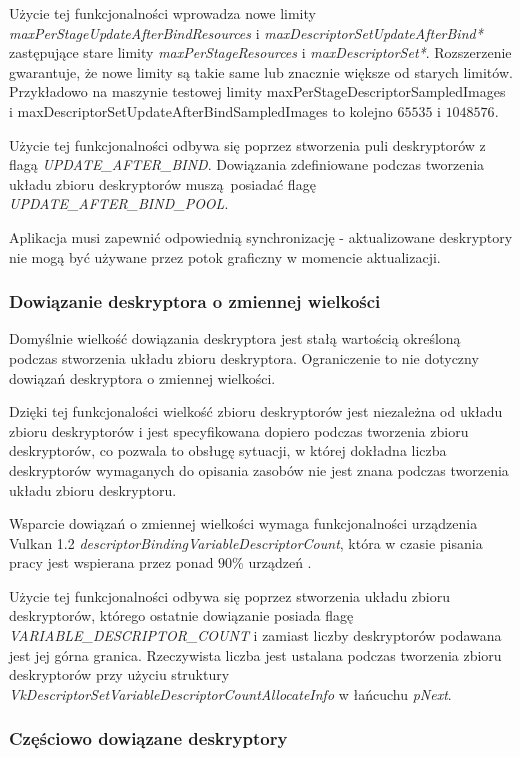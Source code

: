 Użycie tej funkcjonalności wprowadza nowe limity \textit{maxPerStageUpdateAfterBindResources} i \textit{maxDescriptorSetUpdateAfterBind*}
zastępujące stare limity \textit{maxPerStageResources} i \textit{maxDescriptorSet*}. Rozszerzenie gwarantuje, że nowe limity są takie same lub znacznie większe od starych limitów. Przykładowo na maszynie testowej limity maxPerStageDescriptorSampledImages i maxDescriptorSetUpdateAfterBindSampledImages to kolejno $65535$ i $1048576$.

Użycie tej funkcjonalności odbywa się poprzez stworzenia puli deskryptorów z flagą \textit{UPDATE\_AFTER\_BIND}. Dowiązania zdefiniowane podczas tworzenia układu zbioru deskryptorów muszą posiadać flagę
\textit{UPDATE\_AFTER\_BIND\_POOL}.

Aplikacja musi zapewnić odpowiednią synchronizację - aktualizowane deskryptory nie mogą być używane przez potok graficzny w momencie aktualizacji.

\subsubsection {Dowiązanie deskryptora o zmiennej wielkości}

Domyślnie wielkość dowiązania deskryptora jest stałą wartością określoną podczas stworzenia układu zbioru deskryptora.
Ograniczenie to nie dotyczny dowiązań deskryptora o zmiennej wielkości.

Dzięki tej funkcjonalości wielkość zbioru deskryptorów jest niezależna od układu zbioru deskryptorów i jest specyfikowana dopiero podczas tworzenia zbioru deskryptorów, co pozwala to obsługę sytuacji, w której dokładna liczba deskryptorów wymaganych do opisania zasobów nie jest znana podczas tworzenia układu zbioru deskryptoru.

Wsparcie dowiązań o zmiennej wielkości wymaga funkcjonalności urządzenia Vulkan 1.2 \textit{descriptorBindingVariableDescriptorCount}, która w czasie pisania pracy jest wspierana przez ponad $90\%$ urządzeń \cite{GPUINFO}.

Użycie tej funkcjonalności odbywa się poprzez stworzenia układu zbioru deskryptorów, którego ostatnie dowiązanie posiada flagę \textit{VARIABLE\_DESCRIPTOR\_COUNT} i zamiast liczby deskryptorów podawana jest jej górna granica.
Rzeczywista liczba jest ustalana podczas tworzenia zbioru deskryptorów przy użyciu struktury \textit{VkDescriptorSetVariableDescriptorCountAllocateInfo} w łańcuchu \textit{pNext}.

\subsubsection {Częściowo dowiązane deskryptory}

